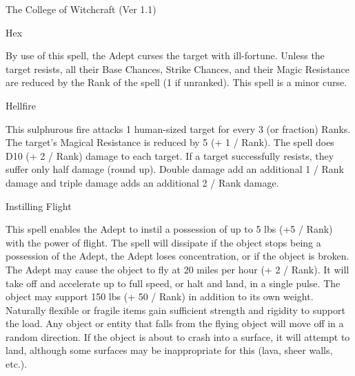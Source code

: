 \begin{Chapter}{The College of Witchcraft (Ver 1.1)}
\begin{spell}[S-12]{Hex}

\begin{effects}
By use of this spell, the Adept curses the target with ill-fortune.
Unless the target resists, all their Base Chances, Strike Chances, and
their Magic Resistance are reduced by the Rank of the spell (1 if
unranked). This spell is a minor curse.
\end{effects}
\end{spell}

\begin{spell}[S-13]{Hellfire}

\begin{effects}
This sulphurous fire attacks 1 human-sized target for every 3 (or
fraction) Ranks. The target’s Magical Resistance is reduced by 5 (+ 1
/ Rank).  The spell does D10 (+ 2 / Rank) damage to each target.  If a
target successfully resists, they suffer only half damage (round up).
Double damage add an additional 1 / Rank damage and triple damage adds
an additional 2 / Rank damage.
\end{effects}
\end{spell}

\begin{spell}[S-14]{Instilling Flight}

\begin{effects}
This spell enables the Adept to instil a possession of up to 5 lbs (+5
/ Rank) with the power of flight.  The spell will dissipate if the
object stops being a possession of the Adept, the Adept loses
concentration, or if the object is broken.  The Adept may cause the
object to fly at 20 miles per hour (+ 2 / Rank).  It will take off and
accelerate up to full speed, or halt and land, in a single pulse. The
object may support 150 lbs (+ 50 / Rank) in addition to its own
weight.  Naturally flexible or fragile items gain sufficient strength
and rigidity to support the load.  Any object or entity that falls
from the flying object will move off in a random direction.  If the
object is about to crash into a surface, it will attempt to land,
although some surfaces may be inappropriate for this (lava, sheer
walls, etc.).
\end{effects}
\end{spell}


\end{Chapter}
